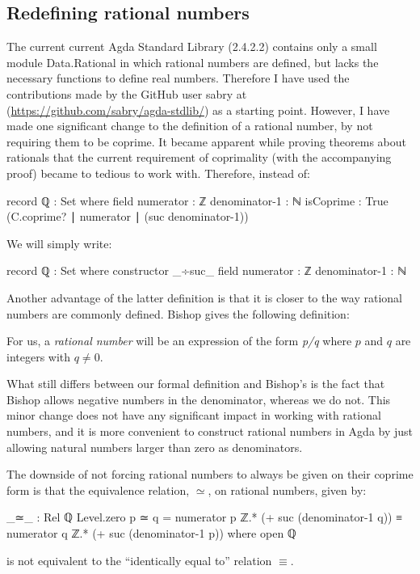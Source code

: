 \documentclass[11pt,a4paper]{article}
\begin{document}
\subsection{Redefining rational numbers}
The current current Agda Standard Library (2.4.2.2) contains only a small module Data.Rational in which rational numbers are defined, but lacks the necessary functions to define real numbers. Therefore I have used the contributions made by the GitHub user sabry at (\url{https://github.com/sabry/agda-stdlib/}) as a starting point. However, I have made one significant change to the definition of a rational number, by not requiring them to be coprime. It became apparent while proving theorems about rationals that the current requirement of coprimality (with the accompanying proof) became to tedious to work with. Therefore, instead of:
\begin{code}
record ℚ : Set where
  field
    numerator     : ℤ
    denominator-1 : ℕ
    isCoprime     : True (C.coprime? ∣ numerator ∣ (suc denominator-1))
\end{code}
We will simply write:
\begin{code}
record ℚ : Set where
  constructor _÷suc_
  field
    numerator     : ℤ
    denominator-1 : ℕ
\end{code}
Another advantage of the latter definition is that it is closer to the way rational numbers are commonly defined. Bishop gives the following definition:
\begin{blockquote}
For us, a \textit{rational number} will be an expression of the form \textit{p/q} where $p$ and $q$ are integers with $q\neq0$.
\end{blockquote}
What still differs between our formal definition and Bishop's is the fact that Bishop allows negative numbers in the denominator, whereas we do not. This minor change does not have any significant impact in working with rational numbers, and it is more convenient to construct rational numbers in Agda by just allowing natural numbers larger than zero as denominators.

The downside of not forcing rational numbers to always be given on their coprime form is that the equivalence relation, $≃$,  on rational numbers, given by:
\begin{code}
_≃_ : Rel ℚ Level.zero
p ≃ q = numerator p ℤ.* (+ suc (denominator-1 q)) ≡
        numerator q ℤ.* (+ suc (denominator-1 p))
  where open ℚ
\end{code}
is not equivalent to the ``identically equal to'' relation $\equiv$.
\end{document}
